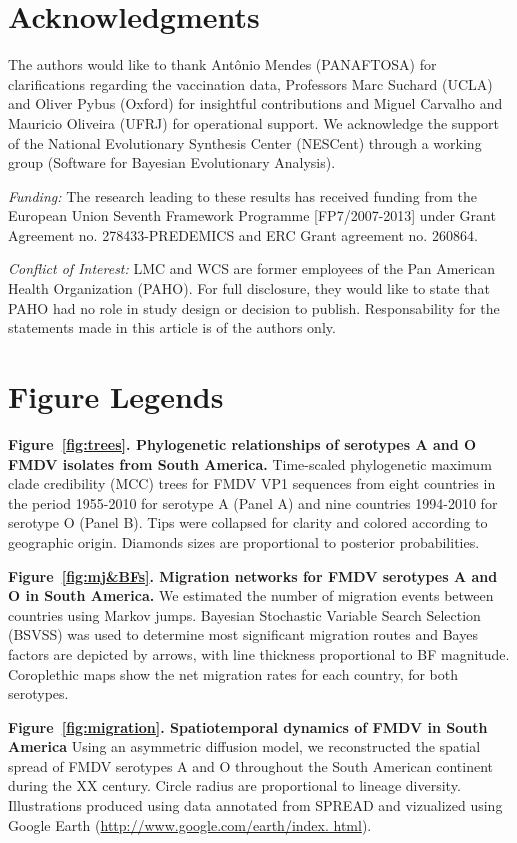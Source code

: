 \documentclass[10pt]{article}
\begin{document}
\section*{Acknowledgments}
The authors would like to thank Ant\^onio Mendes (PANAFTOSA) for clarifications regarding the vaccination data, Professors Marc Suchard (UCLA) and Oliver Pybus (Oxford) for insightful contributions and Miguel Carvalho and Mauricio Oliveira (UFRJ) for operational support.
We acknowledge the support of the National Evolutionary Synthesis Center (NESCent) through a working group (Software for Bayesian Evolutionary Analysis).

\emph{Funding:} The research leading to these results has received funding from the European Union Seventh Framework Programme [FP7/2007-2013] under Grant Agreement no. 278433-PREDEMICS and ERC Grant agreement no. 260864.

\emph{Conflict of Interest:} LMC and WCS are former employees of the Pan American Health Organization (PAHO). For full disclosure, they would like to state that PAHO had no role in study design or decision to publish. Responsability for the statements made in this article is of the authors only.

\newpage

\newpage
\section*{Figure Legends}

{\bf Figure~\ref{fig:trees}. Phylogenetic relationships of serotypes A and O FMDV isolates from South America.} Time-scaled phylogenetic maximum clade credibility (MCC) trees for FMDV VP1 sequences from eight countries in the period 1955-2010 for serotype A (Panel A) and nine countries 1994-2010 for serotype O (Panel B).
Tips were collapsed for clarity and colored according to geographic origin.
Diamonds sizes are proportional to posterior probabilities.

{\bf Figure~\ref{fig:mj&BFs}. Migration networks for FMDV serotypes A and O in South America.} We estimated the number of migration events between countries using Markov jumps.
Bayesian Stochastic Variable Search Selection (BSVSS) was used to determine most significant migration routes and Bayes factors are depicted by arrows, with line thickness proportional to BF magnitude.
Coroplethic maps show the net migration rates for each country, for both serotypes.

{\bf Figure~\ref{fig:migration}. Spatiotemporal dynamics of FMDV in South America} Using an asymmetric diffusion model, we reconstructed the spatial spread of FMDV serotypes A and O throughout the South American continent during the XX century.
Circle radius are proportional to lineage diversity.
Illustrations produced using data annotated from SPREAD \cite{spread} and vizualized using Google Earth (\url{http://www.google.com/earth/index.
html}).
\end{document}
